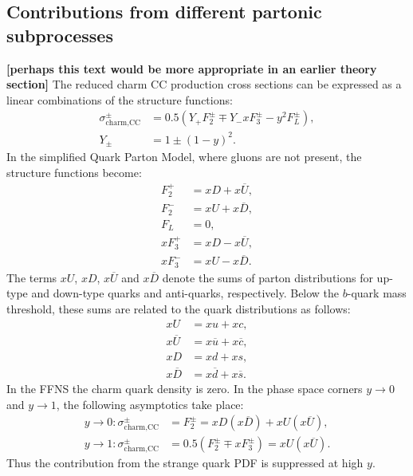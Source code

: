 \documentclass[pdftex,twocolumn,epjc3]{svjour3}          %
\begin{document}
\color{black} %



\subsection{Contributions from different partonic subprocesses}
\label{sec:thpred-partonic}

{\bf [perhaps this text would be more appropriate in an earlier theory section]}
The reduced charm CC production cross sections can be expressed as a linear combinations of the structure functions:
\begin{equation}
\begin{split}
    \sigma^{\pm}_{\text{charm,CC}} &= 0.5(Y_{+}F_2^{\pm} \mp Y_{-}xF_3^{\pm} - y^2F_L^{\pm}),\\
    Y_{\pm} &= 1 \pm (1-y)^2.
\end{split}
\end{equation}
In the simplified Quark Parton Model, where gluons are not present, the structure functions become:
\begin{equation}
\begin{split}
    F_2^{+} &= xD + x\overline{U}, \\
    F_2^{-} &= xU + x\overline{D},\\
    F_L &= 0,\\
    xF_3^{+} &= xD - x\overline{U}, \\
    xF_3^{-} &= xU - x\overline{D}.
\end{split}
\end{equation}
The terms $xU$, $xD$, $x\overline{U}$ and $x\overline{D}$ denote the sums of parton distributions for up-type and down-type quarks and anti-quarks, respectively. 
Below the $b$-quark mass threshold, these sums are related to the quark distributions as follows:
\begin{equation}
\begin{split}
 xU &= xu + xc , \\
 x\overline{U} &= x\overline{u} + x\overline{c} , \\
 xD &= xd + xs , \\
 x\overline{D} &= x\overline{d} + x\overline{s}.
\end{split}
\end{equation}
In the FFNS the charm quark density is zero.
In the phase space corners $y \to 0$ and $y \to 1$, the following asymptotics take place:
\begin{equation}
\begin{split}
 y \to 0: \sigma^{\pm}_{\text{charm,CC}} &= F_2^{\pm} = xD(x\overline{D}) + xU(x\overline{U}), \\
 y \to 1: \sigma^{\pm}_{\text{charm,CC}} &= 0.5(F_2^{\pm} \mp xF_3^{\pm}) = xU (x\overline{U}).
\label{eq:y01}
\end{split}
\end{equation}
Thus the contribution from the strange quark PDF is suppressed at high $y$.
\end{document}
